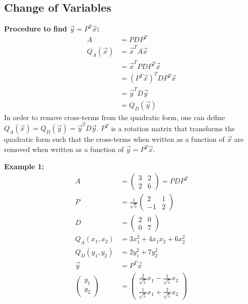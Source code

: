 \subsection{Change of Variables}
\textbf{Procedure to find \(\Vec{y} = P^T \Vec{x}\):}
\begin{align}
    A &= PDP^T \\
    Q_A(\Vec{x}) &= \Vec{x}^T A \Vec{x} \\
    &= \Vec{x}^T PDP^T \Vec{x} \\
    &= (P^T \Vec{x})^T D P^T \Vec{x} \\
    &= \Vec{y}^T D \Vec{y} \\
    &= Q_D(\Vec{y})
\end{align}
In order to remove cross-terms from the quadratic form, one can define \(Q_A(\Vec{x}) = Q_D(\Vec{y}) = \Vec{y}^T D \Vec{y}\). \(P^T\) is a rotation matrix that transforms the quadratic form such that the cross-terms when written as a function of \(\Vec{x}\) are removed when written as a function of \(\Vec{y}=P^T \Vec{x}\).

\noindent
\newline
\textbf{Example 1:}
\begin{align}
    A &= \begin{pmatrix}
        3 & 2 \\ 2 & 6
    \end{pmatrix} = PDP^T \\
    P &= \frac{1}{\sqrt{5}} \begin{pmatrix}
        2 & 1 \\ -1 & 2
    \end{pmatrix} \\
    D &= \begin{pmatrix}
        2 & 0 \\ 0 & 7
    \end{pmatrix} \\
    Q_A(x_1, x_2) &= 3x_1^2 + 4x_1 x_2 + 6x_2^2 \\
    Q_D(y_1, y_2) &= 2y_1^2 + 7y_2^2 \\
    \Vec{y} &= P^T \Vec{x} \\
    \begin{pmatrix}
        y_1 \\ y_2
    \end{pmatrix} &= \begin{pmatrix}
        \frac{2}{\sqrt{5}} x_1 -\frac{1}{\sqrt{5}} x_2 \\
        \frac{1}{\sqrt{5}} x_1 +\frac{2}{\sqrt{5}} x_2
    \end{pmatrix}
\end{align} 

